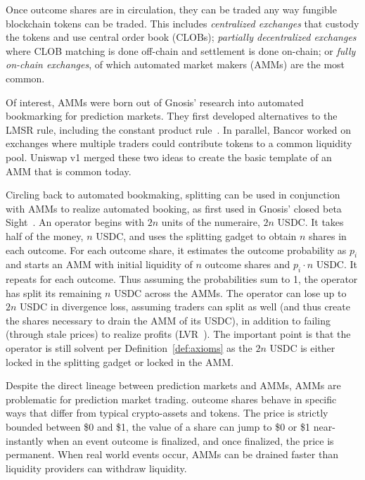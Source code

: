 Once outcome shares are in circulation, they can be traded any way fungible blockchain tokens can be traded. This includes \textit{centralized exchanges} that custody the tokens and use central order book (CLOBs); \textit{partially decentralized exchanges} where CLOB matching is done off-chain and settlement is done on-chain; or \textit{fully on-chain exchanges}, of which automated market makers (AMMs) are the most common. 

Of interest, AMMs were born out of Gnosis' research into automated bookmarking for prediction markets. They first developed alternatives to the LMSR rule, including the constant product rule~\cite{LK17}. In parallel, Bancor worked on exchanges where multiple traders could contribute tokens to a common liquidity pool. Uniswap v1 merged these two ideas to create the basic template of an AMM that is common today.

Circling back to automated bookmaking, splitting can be used in conjunction with AMMs to realize automated booking, as first used in Gnosis' closed beta Sight~\cite{Bar19}. An operator begins with $2n$ units of the numeraire, \eg $2n$ USDC. It takes half of the money, $n$ USDC, and uses the splitting gadget to obtain $n$ shares in each outcome. For each outcome share, it estimates the outcome probability as $p_i$ and starts an AMM with initial liquidity of $n$ outcome shares and $p_i\cdot n$ USDC. It repeats for each outcome. Thus assuming the probabilities sum to 1, the operator has split its remaining $n$ USDC across the AMMs. The operator can lose up to $2n$ USDC in divergence loss, assuming traders can split as well (and thus create the shares necessary to drain the AMM of its USDC), in addition to failing (through stale prices) to realize profits (\ie LVR~\cite{MMRZ22}). The important point is that the operator is still solvent per Definition~\ref{def:axioms} as the $2n$ USDC is either locked in the splitting gadget or locked in the AMM.

Despite the direct lineage between prediction markets and AMMs, AMMs are problematic for prediction market trading. \depm outcome shares behave in specific ways that differ from typical crypto-assets and tokens. The price is strictly bounded between \$0 and \$1, the value of a share can jump to \$0 or \$1 near-instantly when an event outcome is finalized, and once finalized, the price is permanent. When real world events occur, AMMs can be drained faster than liquidity providers can withdraw liquidity. 


